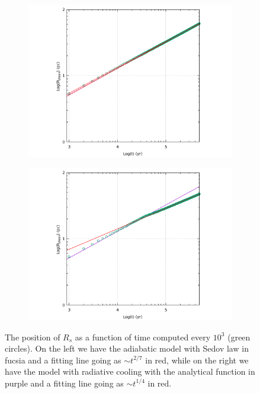 \documentclass{article}
\begin{document}
\begin{figure}[H]
	\begin{subfigure}{0.5 \linewidth}
		\centering
		\includegraphics[width=1 \linewidth]{sedov.pdf}
	\end{subfigure}
	\begin{subfigure}{0.5 \linewidth}
		\centering
		\includegraphics[width=1 \linewidth]{sedovcool.pdf}
	\end{subfigure}
	\caption{The position of $R_s$ as a function of time computed every $10^3$ (green circles). On the left we have the adiabatic model with Sedov law in fucsia and a fitting line going as $\sim t^{2/7}$ in red, while on the right we have the model with radiative cooling with the analytical function in purple and a fitting line going as $\sim t^{1/4}$ in red.}

	\label{fig:sedov}
\end{figure}
\end{document}
